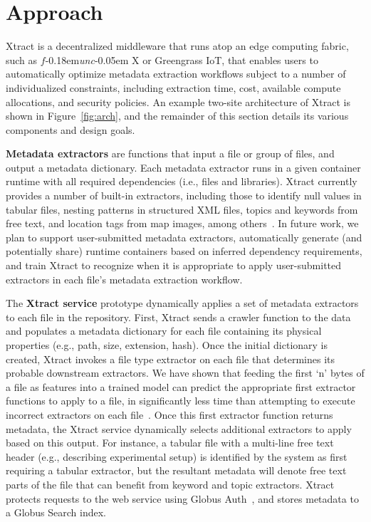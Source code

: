 \documentclass[sigconf, 9pt]{acmart}
\newcommand{\name}{Xtract}
\newcommand{\funcx}{$f$\kern-0.18em\emph{unc}\kern-0.05em X}
\begin{document}
\section{Approach}
\label{sec:approach}

\name{} is a decentralized middleware that runs atop an edge computing fabric, such as \funcx{} or Greengrass IoT, that 
enables users to automatically optimize metadata extraction workflows subject to 
a number of individualized constraints, including extraction time, cost, available compute allocations, and security policies. 
An example two-site architecture of \name{} is shown in Figure~\ref{fig:arch}, and the remainder of this section 
details its various components and design goals.

\textbf{Metadata extractors} are functions that input a file or group of files, and output a metadata dictionary. 
Each metadata extractor runs in a given container runtime with all required dependencies (i.e., files and 
libraries).  \name{} currently provides a number of built-in extractors, including
those to identify null values in tabular files, nesting patterns in structured XML files, topics and keywords from free text, and location tags from map images, 
among others~\cite{skluzacek2019serverless}. In future work, 
we plan to support user-submitted metadata extractors, automatically generate (and potentially share) runtime containers based on inferred 
dependency requirements, and train \name{} to recognize when it is appropriate to apply user-submitted extractors in each file's metadata extraction workflow. 

The \textbf{\name{} service} prototype dynamically applies a set of metadata extractors to each file in the repository. 
First, \name{} sends a crawler function to the data and populates a metadata dictionary for each file containing
its physical properties (e.g., path, size, extension, hash).  Once the initial dictionary is created, \name{} invokes a file type extractor on each 
file that determines its probable downstream extractors. We have shown that feeding 
the first `n' bytes of a file as features into 
a trained model can predict the appropriate first extractor functions to apply to a file, in significantly less time
than attempting to execute incorrect extractors on each file~\cite{skluzacek2018skluma}. Once this first extractor function returns metadata, the \name{} service dynamically selects additional extractors to apply based on this output.  For instance, 
a tabular file with a multi-line free text header (e.g., describing experimental setup) is identified by the system as first requiring a tabular extractor, but 
the resultant metadata will denote free text parts of the file that can benefit from keyword and topic extractors.
\name{} protects requests to the web service using Globus Auth~\cite{tuecke2016globus}, and stores metadata to a Globus Search index. 
\end{document}
